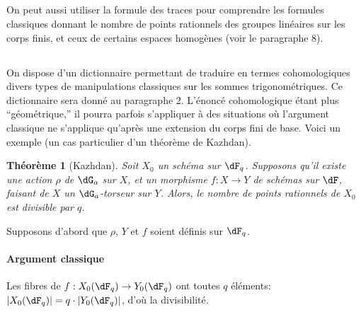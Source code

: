 \documentclass[oneside]{book}
\theoremstyle{sga-source}
\theoremstyle{sga-source-dash}
\theoremstyle{sga-source-dotdash}
\theoremstyle{sga-source-number-note-dash}
\theoremstyle{sga-source-note-number-dotdash}
\theoremstyle{sga-source-example-dotdash}
\theoremstyle{sga-source-inline-number}
\theoremstyle{sga-source-bare-number}
\theoremstyle{sga-source}
\newtheorem{theorem_}[subsection]{Théorème}
\newcommand{\PrintPage}[1]{}\newcommand{\MathPage}[1]{}\newcommand{\PrintCite}[2]{#1}\newcommand{\var}[3]{#2}
\begin{document}
\subsection{}\label{VI:1-11}

On peut aussi utiliser la formule des traces pour comprendre les formules 
classiques donnant le nombre de points rationnels des groupes linéaires sur 
les corps finis, et ceux de certains espaces homogènes (voir le paragraphe 
8). 





\subsection{}\label{VI:1-12}

On dispose d'un dictionnaire permettant de traduire en termes cohomologiques 
divers types de manipulations classiques sur les sommes 
trigonométriques. Ce dictionnaire sera donné au paragraphe 2. L'énoncé 
cohomologique étant plus ``géométrique,'' il pourra parfois s'appliquer 
à des situations où l'argument classique ne s'applique qu'après une 
extension du corps fini de base. Voici un exemple (un cas particulier d'un 
théorème de Kazhdan). 





\begin{theorem_}[Kazhdan]\label{VI:1-13}
Soit $X_0$ un schéma sur $\dF_q$. Supposons qu'il existe une action $\rho$ de 
$\dG_a$ sur $X$, et un morphisme $f:X\to Y$ de schémas sur $\dF$, faisant de 
$X$ un $\dG_a$-torseur sur $Y$. Alors, le nombre de points rationnels de $X_0$ 
est divisible par $q$.
\end{theorem_}

\PrintPage{176}
Supposons d'abord que $\rho$, $Y$ et $f$ soient définis sur $\dF_q$. 


\paragraph{Argument classique}
Les fibres de $f:X_0(\dF_q)\to Y_0(\dF_q)$ ont toutes $q$ éléments: 
$|X_0(\dF_q)| = q\cdot |Y_0(\dF_q)|$, d'où la divisibilité. 
\end{document}
